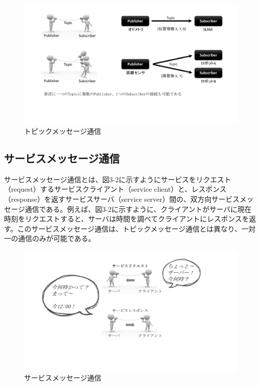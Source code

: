 \begin{figure}[h]
  \centering
  \includegraphics[width=12cm]{pictures/chapter3/pic_03_01.png}
  \caption{トピックメッセージ通信}
\end{figure}

\subsection{サービスメッセージ通信}
サービスメッセージ通信とは、図3-2に示すようにサービスをリクエスト（request）するサービスクライアント（service client）と、レスポンス（response）を返すサービスサーバ（service server）間の、双方向サービスメッセージ通信である。例えば、図3-2に示すように、クライアントがサーバに現在時刻をリクエストすると、サーバは時間を調べてクライアントにレスポンスを返す。このサービスメッセージ通信は、トピックメッセージ通信とは異なり、一対一の通信のみが可能である。

\begin{figure}[h]
  \centering
  \includegraphics[width=12cm]{pictures/chapter3/pic_03_02.png}
  \caption{サービスメッセージ通信}
\end{figure}

